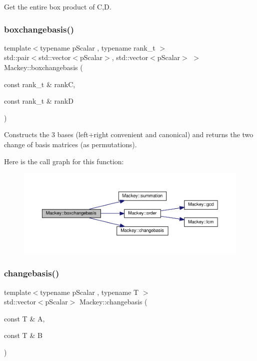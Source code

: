 Get the entire box product of C,D. 

\mbox{\label{namespaceMackey_aec14170f140793a5ef29eef799f217ce}} 
\subsubsection{\texorpdfstring{boxchangebasis()}{boxchangebasis()}}
{\footnotesize\ttfamily template$<$typename p\+Scalar , typename rank\+\_\+t $>$ \\
std\+::pair$<$std\+::vector$<$p\+Scalar$>$, std\+::vector$<$p\+Scalar$>$ $>$ Mackey\+::boxchangebasis (\begin{DoxyParamCaption}\item[{const rank\+\_\+t \&}]{rankC,  }\item[{const rank\+\_\+t \&}]{rankD }\end{DoxyParamCaption})}



Constructs the 3 bases (left+right convenient and canonical) and returns the two change of basis matrices (as permutations). 

Here is the call graph for this function\+:\nopagebreak
\begin{figure}[H]
\begin{center}
\leavevmode
\includegraphics[width=350pt]{namespaceMackey_aec14170f140793a5ef29eef799f217ce_cgraph}
\end{center}
\end{figure}
\mbox{\label{namespaceMackey_aa2823da3a4b93dca63e00e50a6bc9fdf}} 
\subsubsection{\texorpdfstring{changebasis()}{changebasis()}}
{\footnotesize\ttfamily template$<$typename p\+Scalar , typename T $>$ \\
std\+::vector$<$p\+Scalar$>$ Mackey\+::changebasis (\begin{DoxyParamCaption}\item[{const T \&}]{A,  }\item[{const T \&}]{B }\end{DoxyParamCaption})}



